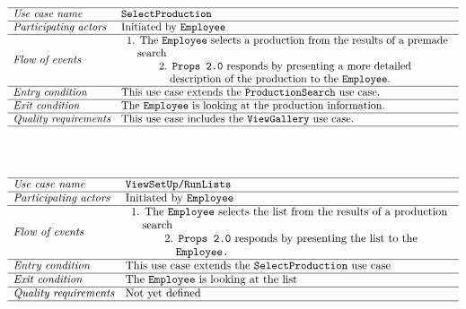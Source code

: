 \documentclass[12pt]{article}
\begin{document}
\\
\\
\[
\begin{array}{ll}
\hline
\textit{Use case name} & \texttt{SelectProduction} \\
\hline
\textit{Participating actors} & \text{Initiated by \texttt{Employee}} \\
\hline
\textit{Flow of events} & 
\begin{array}{l}
\text{1. The \texttt{Employee} selects a production from the results of a premade}\\ \quad \text{search}\\
\quad \quad \quad \text{2. \texttt{Props 2.0} responds by presenting a more detailed}\\
\quad \quad \quad \quad \text{description of the production to the \texttt{Employee}.}
\end{array} \\
\hline
\textit{Entry condition} &
\text{This use case extends the \texttt{ProductionSearch} use case.}\\
\hline
\textit{Exit condition} & \text{The \texttt{Employee} is looking at the production information.} \\
\hline
\textit{Quality requirements} & \text{This use case includes the \texttt{ViewGallery} use case.} \\
\hline
\end{array}
\]
\\
\\
\[
\begin{array}{ll}
\hline
\textit{Use case name} & \texttt{ViewSetUp/RunLists} \\
\hline
\textit{Participating actors} & \text{Initiated by \texttt{Employee}} \\
\hline
\textit{Flow of events} & 
\begin{array}{l}
\text{1. The \texttt{Employee} selects the list from the results of a production} \\ \quad \text{search} \\
\quad \quad \quad \text{2. \texttt{Props 2.0} responds by presenting the list to the}\\ \quad \quad \quad \quad \texttt{Employee.}
\end{array} \\
\hline
\textit{Entry condition} & \text{This use case extends the  \texttt{SelectProduction} use case} \\
\hline
\textit{Exit condition} & \text{The \texttt{Employee} is looking at the list} \\
\hline
\textit{Quality requirements} & \text{Not yet defined} \\
\hline
\end{array}
\]
\end{document}
